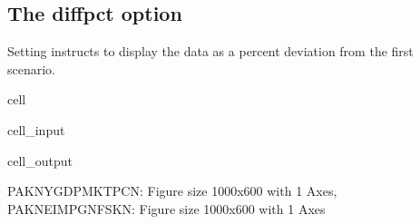 \documentclass[letterpaper,10pt,english]{jupyterBook}
\begin{document}
\subsection{The diffpct option}
\label{\detokenize{content/05_WBModels/ScenarioAnalysis:the-diffpct-option}}
\sphinxAtStartPar
Setting  instructs  to display the data as a percent deviation from the first  scenario.

\begin{sphinxuseclass}{cell}\begin{sphinxVerbatimInput}

\begin{sphinxuseclass}{cell_input}
\begin{sphinxVerbatim}[commandchars=\\\{\}]
 
\end{sphinxVerbatim}

\end{sphinxuseclass}\end{sphinxVerbatimInput}
\begin{sphinxVerbatimOutput}

\begin{sphinxuseclass}{cell_output}
\noindent{}

\noindent{}

\begin{sphinxVerbatim}[commandchars=\\\{\}]
\PYGZob{}\PYGZsq{}PAKNYGDPMKTPCN\PYGZsq{}: \PYGZlt{}Figure size 1000x600 with 1 Axes\PYGZgt{},
 \PYGZsq{}PAKNEIMPGNFSKN\PYGZsq{}: \PYGZlt{}Figure size 1000x600 with 1 Axes\PYGZgt{}\PYGZcb{}
\end{sphinxVerbatim}

\end{sphinxuseclass}\end{sphinxVerbatimOutput}

\end{sphinxuseclass}
\end{document}
